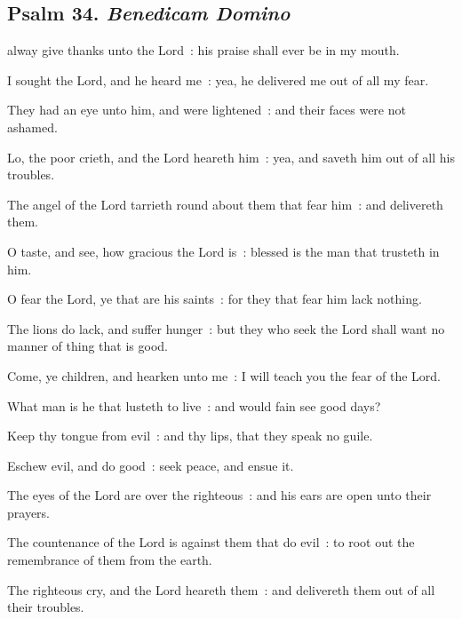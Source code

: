 \clearpage
\subsection{Psalm 34. \textit{Benedicam Domino}}


 alway give thanks unto the Lord~: his praise shall ever be in my mouth.\par
{}
I sought the Lord, and he heard me~: yea, he delivered me out of all my fear.\par
{}They had an eye unto him, and were lightened~: and their faces were not ashamed.\par
{}Lo, the poor crieth, and the Lord heareth him~: yea, and saveth him out of all his troubles.\par
{}The angel of the Lord tarrieth round about them that fear him~: and delivereth them.\par
{}O taste, and see, how gracious the Lord is~: blessed is the man that trusteth in him.\par
{}O fear the Lord, ye that are his saints~: for they that fear him lack nothing.\par
{}The lions do lack, and suffer hunger~: but they who seek the Lord shall want no manner of thing that is good.\par
{}Come, ye children, and hearken unto me~: I will teach you the fear of the Lord.\par
{}What man is he that lusteth to live~: and would fain see good days?\par
{}Keep thy tongue from evil~: and thy lips, that they speak no guile.\par
{}Eschew evil, and do good~: seek peace, and ensue it.\par
{}The eyes of the Lord are over the righteous~: and his ears are open unto their prayers.\par
{}The countenance of the Lord is against them that do evil~: to root out the remembrance of them from the earth.\par
{}The righteous cry, and the Lord heareth them~: and delivereth them out of all their troubles.\par
